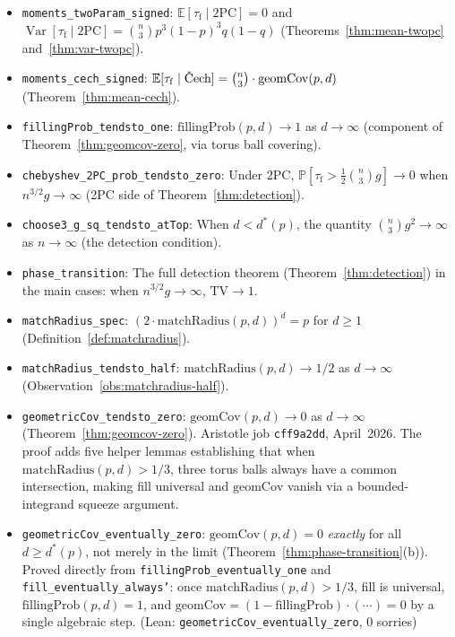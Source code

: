 \documentclass[reqno,12pt]{amsart}
\newcommand{\tauf}{\tau_{\mathrm{f}}}
\newcommand{\PC}{\mathrm{2PC}}
\newcommand{\Cech}{\ifmmode\text{\v{C}ech}\else\v{C}ech\fi}  %
\newcommand{\TV}{\mathrm{TV}}
\newcommand{\geomCov}{\mathrm{geomCov}}
\newcommand{\fillingP}{\mathrm{fillingProb}}
\newcommand{\matchR}{\mathrm{matchRadius}}
\newcommand{\EE}{\mathbb{E}}
\newcommand{\PP}{\mathbb{P}}
\DeclareMathOperator{\Var}{Var}
\newcommand{\lean}[1]{\textup{\texttt{\small #1}}}
\newcommand{\leanverified}[1]{\textup{(Lean: \texttt{#1}, 0 sorries)}}
\theoremstyle{plain}
\theoremstyle{definition}
\theoremstyle{remark}
\begin{document}
\begin{itemize}[leftmargin=*, itemsep=4pt]
\item \lean{moments\_twoParam\_signed}: $\EE[\tauf\mid\PC] = 0$ and
  $\Var[\tauf\mid\PC] = \binom{n}{3}p^3(1-p)^3 q(1-q)$
  (Theorems~\ref{thm:mean-twopc} and~\ref{thm:var-twopc}).

\item \lean{moments\_cech\_signed}: $\EE[\tauf\mid\Cech] = \binom{n}{3}\cdot\geomCov(p,d)$
  (Theorem~\ref{thm:mean-cech}).

\item \lean{fillingProb\_tendsto\_one}: $\fillingP(p,d)\to 1$ as $d\to\infty$
  (component of Theorem~\ref{thm:geomcov-zero}, via torus ball covering).

\item \lean{chebyshev\_2PC\_prob\_tendsto\_zero}: Under $\PC$,
  $\PP[\tauf > \frac{1}{2}\binom{n}{3}g]\to 0$ when $n^{3/2}g\to\infty$
  (2PC side of Theorem~\ref{thm:detection}).

\item \lean{choose3\_g\_sq\_tendsto\_atTop}: When $d < d^*(p)$, the quantity
  $\binom{n}{3}g^2\to\infty$ as $n\to\infty$ (the detection condition).

\item \lean{phase\_transition}: The full detection theorem (Theorem~\ref{thm:detection})
  in the main cases: when $n^{3/2}g\to\infty$, $\TV\to 1$.

\item \lean{matchRadius\_spec}: $(2\cdot\matchR(p,d))^d = p$ for $d\geq 1$
  (Definition~\ref{def:matchradius}).

\item \lean{matchRadius\_tendsto\_half}: $\matchR(p,d)\to 1/2$ as $d\to\infty$
  (Observation~\ref{obs:matchradius-half}).

\item \lean{geometricCov\_tendsto\_zero}: $\geomCov(p,d)\to 0$ as $d\to\infty$
  (Theorem~\ref{thm:geomcov-zero}). Aristotle job \texttt{cff9a2dd}, April~2026.
  The proof adds five helper lemmas establishing that when $\matchR(p,d)>1/3$,
  three torus balls always have a common intersection, making fill universal and
  $\geomCov$ vanish via a bounded-integrand squeeze argument.

\item \lean{geometricCov\_eventually\_zero}: $\geomCov(p,d) = 0$ \emph{exactly}
  for all $d \geq d^*(p)$, not merely in the limit
  (Theorem~\ref{thm:phase-transition}(b)).
  Proved directly from \lean{fillingProb\_eventually\_one} and
  \lean{fill\_eventually\_always'}: once $\matchR(p,d) > 1/3$, fill is universal,
  $\fillingP(p,d) = 1$, and $\geomCov = (1-\fillingP)\cdot(\cdots) = 0$
  by a single algebraic step. \leanverified{geometricCov\_eventually\_zero}


\end{itemize}
\end{document}
